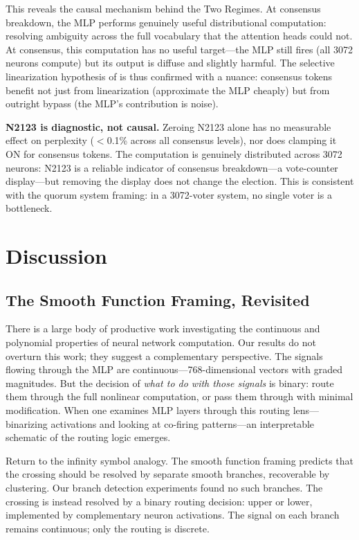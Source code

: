 \documentclass{article}
\begin{document}
This reveals the causal mechanism behind the Two Regimes. At consensus breakdown, the MLP
performs genuinely useful distributional computation: resolving ambiguity across the full
vocabulary that the attention heads could not. At consensus, this computation has no
useful target---the MLP still fires (all 3072 neurons compute) but its output is diffuse
and slightly harmful. The selective linearization hypothesis of
\citet{balogh2026swordsman} is thus confirmed with a nuance: consensus tokens benefit
not just from linearization (approximate the MLP cheaply) but from outright bypass
(the MLP's contribution is noise).

\textbf{N2123 is diagnostic, not causal.} Zeroing N2123 alone has no measurable effect on
perplexity ($<$0.1\% across all consensus levels), nor does clamping it ON for consensus tokens.
The computation is genuinely distributed across 3072 neurons: N2123 is a reliable indicator of
consensus breakdown---a vote-counter display---but removing the display does not change the
election. This is consistent with the quorum system framing: in a 3072-voter system, no single
voter is a bottleneck.

\section{Discussion}

\subsection{The Smooth Function Framing, Revisited}

There is a large body of productive work investigating the continuous and polynomial
properties of neural network computation. Our results do not overturn this work;
they suggest a complementary perspective. The signals flowing through the MLP are
continuous---768-dimensional vectors with graded magnitudes. But the decision of
\emph{what to do with those signals} is binary: route them through the full nonlinear
computation, or pass them through with minimal modification. When one examines MLP
layers through this routing lens---binarizing activations and looking at co-firing
patterns---an interpretable schematic of the routing logic emerges.

Return to the infinity symbol analogy. The smooth function framing predicts that
the crossing should be resolved by separate smooth branches, recoverable by clustering.
Our branch detection experiments found no such branches. The crossing is instead resolved by
a binary routing decision: upper or lower, implemented by complementary neuron activations.
The signal on each branch remains continuous; only the routing is discrete.
\end{document}
